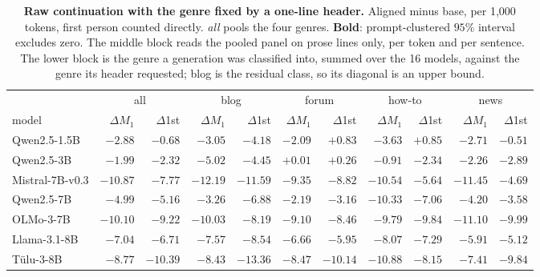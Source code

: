 \begin{table}[tb]\centering\scriptsize\setlength{\tabcolsep}{2.8pt}
\caption{\textbf{Raw continuation with the genre fixed by a one-line header.} Aligned minus base, per 1,000 tokens, first person counted directly. \emph{all} pools the four genres. \textbf{Bold}: prompt-clustered $95\%$ interval excludes zero. The middle block reads the pooled panel on prose lines only, per token and per sentence. The lower block is the genre a generation was classified into, summed over the 16 models, against the genre its header requested; blog is the residual class, so its diagonal is an upper bound.}\label{tab:tur}
\begin{tabular}{lrrrrrrrrrr}\toprule
 & \multicolumn{2}{c}{all} & \multicolumn{2}{c}{blog} & \multicolumn{2}{c}{forum} & \multicolumn{2}{c}{how-to} & \multicolumn{2}{c}{news} \\
\cmidrule(lr){2-3}\cmidrule(lr){4-5}\cmidrule(lr){6-7}\cmidrule(lr){8-9}\cmidrule(lr){10-11}
model & $\Delta M_1$ & $\Delta$1st & $\Delta M_1$ & $\Delta$1st & $\Delta M_1$ & $\Delta$1st & $\Delta M_1$ & $\Delta$1st & $\Delta M_1$ & $\Delta$1st \\ \midrule
Qwen2.5-1.5B & $\mathbf{-2.88}$ & $-0.68$ & $\mathbf{-3.05}$ & $\mathbf{-4.18}$ & $\mathbf{-2.09}$ & $+0.83$ & $-3.63$ & $+0.85$ & $-2.71$ & $-0.51$ \\
Qwen2.5-3B & $\mathbf{-1.99}$ & $\mathbf{-2.32}$ & $\mathbf{-5.02}$ & $\mathbf{-4.45}$ & $+0.01$ & $+0.26$ & $-0.91$ & $\mathbf{-2.34}$ & $\mathbf{-2.26}$ & $-2.89$ \\
Mistral-7B-v0.3 & $\mathbf{-10.87}$ & $\mathbf{-7.77}$ & $\mathbf{-12.19}$ & $\mathbf{-11.59}$ & $\mathbf{-9.35}$ & $\mathbf{-8.82}$ & $\mathbf{-10.54}$ & $\mathbf{-5.64}$ & $\mathbf{-11.45}$ & $\mathbf{-4.69}$ \\
Qwen2.5-7B & $\mathbf{-4.99}$ & $\mathbf{-5.16}$ & $\mathbf{-3.26}$ & $\mathbf{-6.88}$ & $\mathbf{-2.19}$ & $\mathbf{-3.16}$ & $\mathbf{-10.33}$ & $\mathbf{-7.06}$ & $\mathbf{-4.20}$ & $\mathbf{-3.58}$ \\
OLMo-3-7B & $\mathbf{-10.10}$ & $\mathbf{-9.22}$ & $\mathbf{-10.03}$ & $\mathbf{-8.19}$ & $\mathbf{-9.10}$ & $\mathbf{-8.46}$ & $\mathbf{-9.79}$ & $\mathbf{-9.84}$ & $\mathbf{-11.10}$ & $\mathbf{-9.99}$ \\
Llama-3.1-8B & $\mathbf{-7.04}$ & $\mathbf{-6.71}$ & $\mathbf{-7.57}$ & $\mathbf{-8.54}$ & $\mathbf{-6.66}$ & $\mathbf{-5.95}$ & $\mathbf{-8.07}$ & $\mathbf{-7.29}$ & $\mathbf{-5.91}$ & $\mathbf{-5.12}$ \\
T\"ulu-3-8B & $\mathbf{-8.77}$ & $\mathbf{-10.39}$ & $\mathbf{-8.43}$ & $\mathbf{-13.36}$ & $\mathbf{-8.47}$ & $\mathbf{-10.14}$ & $\mathbf{-10.88}$ & $\mathbf{-8.15}$ & $\mathbf{-7.41}$ & $\mathbf{-9.84}$ \\

\end{tabular}
\end{table}
